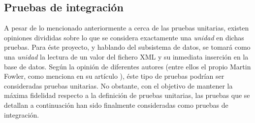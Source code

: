 \subsection{Pruebas de integración}
A pesar de lo mencionado anteriormente a cerca de las pruebas unitarias, existen opiniones divididas sobre lo que se considera exactamente una \textit{unidad} en dichas pruebas.  Para éste proyecto, y hablando del subsistema de datos, se tomará como una \textit{unidad} la lectura de un valor del fichero XML y su inmediata inserción en la base de datos.\newline
Según la opinión de diferentes autores (entre ellos el propio Martin Fowler, como menciona en su artículo \cite{mfowler:unit-testing}), éste tipo de pruebas podrían ser consideradas pruebas unitarias.  No obstante, con el objetivo de mantener la máxima fidelidad respecto a la definición de pruebas unitarias, las pruebas que se detallan a continuación han sido finalmente consideradas como pruebas de integración.

